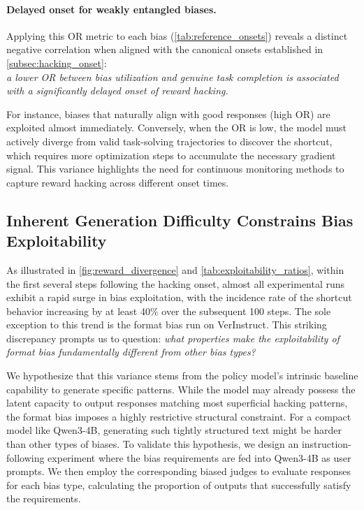 \documentclass[11pt]{article}
\begin{document}
\paragraph{Delayed onset for weakly entangled biases.}
Applying this OR metric to each bias (\cref{tab:reference_onsets}) reveals a distinct negative correlation when aligned with the canonical onsets established in \cref{subsec:hacking_onset}: \\
\emph{a lower OR between bias utilization and genuine task completion is associated with a significantly delayed onset of reward hacking.}


For instance, biases that naturally align with good responses (high OR) are exploited almost immediately. Conversely, when the OR is low, the model must actively diverge from valid task-solving trajectories to discover the shortcut, which requires more optimization steps to accumulate the necessary gradient signal. This variance highlights the need for continuous monitoring methods to capture reward hacking across different onset times.

 \vspace{-2mm}

\subsection{Inherent Generation Difficulty Constrains Bias Exploitability}
\label{subsec:exploitability_complexity}

As illustrated in \cref{fig:reward_divergence} and \cref{tab:exploitability_ratios}, within the first several steps following the hacking onset, almost all experimental runs exhibit a rapid surge in bias exploitation, with the incidence rate of the shortcut behavior increasing by at least 40\% over the subsequent 100 steps. The sole exception to this trend is the format bias run on VerInstruct. This striking discrepancy prompts us to question: \textit{what properties make the exploitability of format bias fundamentally different from other bias types?}


We hypothesize that this variance stems from the policy model's intrinsic baseline capability to generate specific patterns. While the model may already possess the latent capacity to output responses matching most superficial hacking patterns, the format bias imposes a highly restrictive structural constraint. For a compact model like Qwen3-4B, generating such tightly structured text might be harder than other types of biases. To validate this hypothesis, we design an instruction-following experiment where the bias requirements are fed into Qwen3-4B as user prompts. We then employ the corresponding biased judges to evaluate responses for each bias type, calculating the proportion of outputs that successfully satisfy the requirements.
\end{document}

